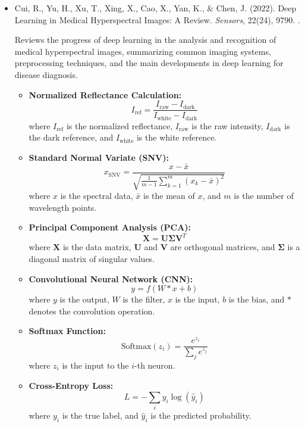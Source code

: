 \documentclass[10pt,svgnames,fragile]{beamer}
\begin{document}
\begin{frame}
\tiny
\begin{itemize}

    \item Cui, R., Yu, H., Xu, T., Xing, X., Cao, X., Yan, K., \& Chen, J. (2022). Deep Learning in Medical Hyperspectral Images: A Review. \textit{Sensors}, 22(24), 9790. \href{https://doi.org/10.3390/s22249790}{\color{blue}{DOI: 10.3390/s22249790}}. \cite{cuiDeepLearningMedical2022}

    {\color{gray}Reviews the progress of deep learning in the analysis and recognition of medical hyperspectral images, summarizing common imaging systems, preprocessing techniques, and the main developments in deep learning for disease diagnosis.}
    \begin{itemize} \tiny
    \item \textbf{Normalized Reflectance Calculation:}
    \[
    I_{\text{ref}} = \frac{I_{\text{raw}} - I_{\text{dark}}}{I_{\text{white}} - I_{\text{dark}}}
    \]
    where \( I_{\text{ref}} \) is the normalized reflectance, \( I_{\text{raw}} \) is the raw intensity, \( I_{\text{dark}} \) is the dark reference, and \( I_{\text{white}} \) is the white reference.

    \item \textbf{Standard Normal Variate (SNV):}
    \[
    x_{\text{SNV}} = \frac{x - \bar{x}}{\sqrt{\frac{1}{m-1} \sum_{k=1}^m (x_k - \bar{x})^2}}
    \]
    where \( x \) is the spectral data, \( \bar{x} \) is the mean of \( x \), and \( m \) is the number of wavelength points.

    \item \textbf{Principal Component Analysis (PCA):}
    \[
    \mathbf{X} = \mathbf{U} \mathbf{\Sigma} \mathbf{V}^T
    \]
    where \( \mathbf{X} \) is the data matrix, \( \mathbf{U} \) and \( \mathbf{V} \) are orthogonal matrices, and \( \mathbf{\Sigma} \) is a diagonal matrix of singular values.

    \item \textbf{Convolutional Neural Network (CNN):}
    \[
    y = f(W * x + b)
    \]
    where \( y \) is the output, \( W \) is the filter, \( x \) is the input, \( b \) is the bias, and \( * \) denotes the convolution operation.

    \item \textbf{Softmax Function:}
    \[
    \text{Softmax}(z_i) = \frac{e^{z_i}}{\sum_{j} e^{z_j}}
    \]
    where \( z_i \) is the input to the \( i \)-th neuron.

    \item \textbf{Cross-Entropy Loss:}
    \[
    L = -\sum_{i} y_i \log(\hat{y}_i)
    \]
    where \( y_i \) is the true label, and \( \hat{y}_i \) is the predicted probability.
\end{itemize}

\end{itemize}
\end{frame}
\end{document}
